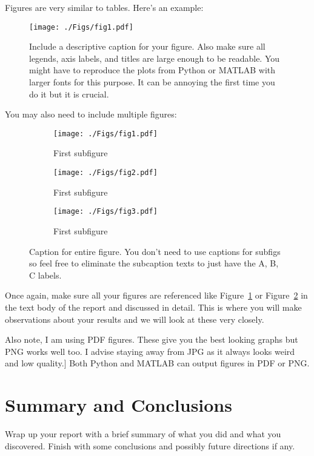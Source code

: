 \documentclass[11pt]{amsart}
\begin{document}
Figures are very similar to tables. Here's an example: 

\begin{figure}[htp]
    \centering
    \texttt{[image: ./Figs/fig1.pdf]}
    \caption{Include a descriptive caption for your figure. Also make sure all 
    legends, axis labels, and titles are large enough to be readable. You might have 
    to reproduce the plots from Python or MATLAB with larger fonts for this purpose. It 
    can be annoying the first time you do it but it is crucial.}
    \label{fig:meaningful-label}
\end{figure}

You may also need to include multiple figures: 

\begin{figure}
    \centering
    \begin{subfigure}[b]{.3\textwidth}
    \texttt{[image: ./Figs/fig1.pdf]}
    \caption{First subfigure}
    \label{subfig:first}
    \end{subfigure}
    \begin{subfigure}[b]{.3\textwidth}
    \texttt{[image: ./Figs/fig2.pdf]}
    \caption{First subfigure}
    \label{subfig:second}
    \end{subfigure}
    \begin{subfigure}[b]{.3\textwidth}
    \texttt{[image: ./Figs/fig3.pdf]}
    \caption{First subfigure}
    \label{subfig:third}
    \end{subfigure}
    \caption{Caption for entire figure. You don't need to use captions for subfigs so 
    feel free to eliminate the subcaption texts to just have the A, B, C labels.}
    \label{fig:meaningful-label-2}
\end{figure}

Once again, make sure all your figures are referenced like Figure~\ref{fig:meaningful-label}
or Figure~\ref{subfig:first} in the text body of the report and discussed 
in detail. This is where you will make observations about your results and we will 
look at these very closely. 

Also note, I am using PDF figures. These give you the best looking graphs but PNG works 
well too. I advise staying away from JPG as it always looks weird and low quality.]
Both Python and MATLAB can output figures in PDF or PNG.

\section{Summary and Conclusions}\label{sec:conclusions}
Wrap up your report with a brief summary of what you did and what you discovered. 
Finish with some conclusions and possibly future directions if any. 
\end{document}
